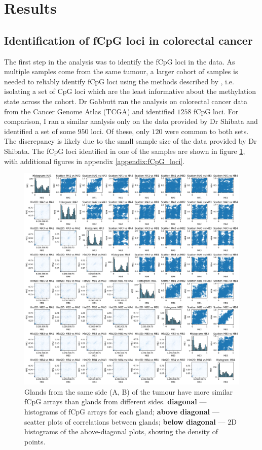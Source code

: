 \section{Results}
\subsection{Identification of fCpG loci in colorectal cancer}
The first step in the analysis was to identify the fCpG loci in the data. As
multiple samples come from the same tumour, a larger cohort of samples is
needed to reliably identify fCpG loci using the methods described by
\cite{gabbutt_evolutionary_2023}, i.e. isolating a set of CpG loci which are
the least informative about the methylation state across the cohort. Dr Gabbutt
ran the analysis on colorectal cancer data from the Cancer Genome Atlas (TCGA)
and identified $1258$ fCpG loci. For comparison, I ran a similar analysis only
on the data provided by Dr Shibata and identified a set of some $950$ loci. Of
these, only $120$ were common to both sets. The discrepancy is likely due to
the small sample size of the data provided by Dr Shibata. The fCpG loci
identified in one of the samples are shown in figure \ref{fig:fCpG_loci_M},
with additional figures in appendix \ref{appendix:fCpG_loci}.

\begin{figure}[h]
    \centering
    \includegraphics[width=\textwidth]{Chapter_5/figures/fCpG_loci_M.png}
    \caption{Glands from the same side (A, B) of the tumour have more similar
    fCpG arrays than glands from different sides. \textbf{diagonal} ---
    histograms of fCpG arrays for each gland; \textbf{above diagonal} ---
    scatter plots of correlations between glands; \textbf{below diagonal} ---
    $2$D histograms of the above-diagonal plots, showing the density of points.}
    \label{fig:fCpG_loci_M}
\end{figure}

